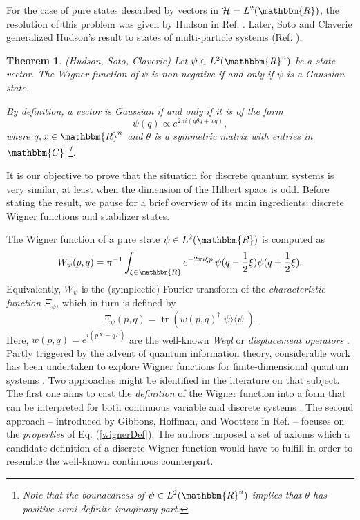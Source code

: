 \documentclass[aps,twocolumn,floatfix]{revtex4}
\newtheorem{theorem}{Theorem}
\def\ket#1.{|#1\rangle}
\def\bra#1.{\langle#1|}
\def\RR{\mathbbm{R}}
\def\CC{\mathbbm{C}}
\def\H{\mathcal{H}}
\DeclareMathOperator{\tr}{tr}
\begin{document}
For the case of pure states described by vectors in $\H=L^2(\RR)$, the
resolution of this problem was given by Hudson in Ref.
\cite{hudson}. Later, Soto and Claverie generalized Hudson's result to
states of multi-particle systems (Ref. \cite{soto}).

\begin{theorem}\label{thHudson}
	\emph{(Hudson, Soto, Claverie)}
	Let $\psi\in L^2(\RR^n)$ be a state vector. The Wigner function of
	$\psi$ is non-negative if and only if $\psi$ is a \emph{Gaussian
	state}.
	
	By definition, a vector is Gaussian if and only if it is of the form
	\begin{equation*}
		\psi(q)\propto e^{2\pi i (q \theta q+x q)},
	\end{equation*}
	where $q,x\in\RR^n$ and $\theta$ is a symmetric matrix with entries in
	$\CC$
	\footnote{
		Note that the boundedness of $\psi\in L^2(\RR^n)$ implies that
		$\theta$ has positive semi-definite imaginary part. 
	}.
\end{theorem}


It is our objective to prove that the situation for discrete quantum
systems is very similar, at least when the dimension of the Hilbert
space is odd. Before stating the result, we pause for a brief overview
of its main ingredients: discrete Wigner functions and stabilizer
states. 

The  Wigner function \cite{wigner} of a
pure state $\psi \in L^2(\RR)$ is computed as
\begin{equation}\label{wignerDef}
	W_\psi(p,q) = \pi^{-1} \int_{\xi\in \RR} e^{-2\pi i\xi p}\, 
	\bar\psi(q-\frac12 \xi)\psi(q+\frac12 \xi).
\end{equation}
Equivalently, $W_\psi$ is the (symplectic) Fourier transform of the
\emph{characteristic function} $\Xi_\psi$, which in turn is defined by
\begin{equation*}
	\Xi_\psi(p,q)=\tr(w(p,q)^\dagger \ket\psi.\bra\psi.).
\end{equation*}
Here, $w(p,q)=e^{i (p \hat X-q \hat P)}$ are the well-known
\emph{Weyl} or \emph{displacement operators}
\cite{wallsmilburn,folland}.  Partly triggered by the advent of
quantum information theory, considerable work has been undertaken to
explore Wigner functions for finite-dimensional quantum systems
\cite{oldWootters,vourdas,leonhardt,miquel,villegar,klimov,ruzzi,
chaturvedi,diploma,wootters}.
Two approaches might be identified in the literature on that subject.
The first one aims to cast the \emph{definition} of the Wigner
function into a form that can be interpreted for both continuous
variable and discrete systems \cite{vourdas,miquel,villegar,diploma}.
The second approach -- introduced by Gibbons, Hoffman, and Wootters in
Ref. \cite{wootters} -- focuses on the \emph{properties} of Eq.
(\ref{wignerDef}).  The authors imposed a set of axioms which a
candidate definition of a discrete Wigner function would have to
fulfill in order to resemble the well-known continuous counterpart.
\end{document}
